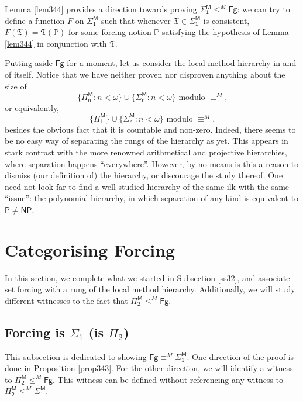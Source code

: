 \documentclass[12pt, twoside]{memoir}
\numberwithin{equation}{section}
\theoremstyle{definition}
\theoremstyle{remark}
\theoremstyle{definition}
\theoremstyle{definition}
\theoremstyle{definition}
\theoremstyle{remark}
\begin{document}
Lemma \ref{lem344} provides a direction towards proving $\mathsf{\Sigma^M_1} \leq^M \mathsf{Fg}$: we can try to define a function $F$ on $\mathsf{\Sigma^M_1}$ such that whenever $\mathfrak{T} \in \mathsf{\Sigma^M_1}$ is consistent, $F(\mathfrak{T}) = \mathfrak{T}(\mathbb{P})$ for some forcing notion $\mathbb{P}$ satisfying the hypothesis of Lemma \ref{lem344} in conjunction with $\mathfrak{T}$. 

Putting aside $\mathsf{Fg}$ for a moment, let us consider the local method hierarchy in and of itself. Notice that we have neither proven nor disproven anything about the size of
\begin{equation*}
    \{\mathsf{\Pi^M_n} : n < \omega\} \cup \{\mathsf{\Sigma^M_n} : n < \omega\} \text{ modulo } \equiv^M \text{,}
\end{equation*}
or equivalently, 
\begin{equation*}
    \{\mathsf{\Pi^M_1}\} \cup \{\mathsf{\Sigma^M_n} : n < \omega\} \text{ modulo } \equiv^M \text{,}
\end{equation*}
besides the obvious fact that it is countable and non-zero. Indeed, there seems to be no easy way of separating the rungs of the hierarchy as yet. This appears in stark contrast with the more renowned arithmetical and projective hierarchies, where separation happens ``everywhere''. However, by no means is this a reason to dismiss (our definition of) the hierarchy, or discourage the study thereof. One need not look far to find a well-studied hierarchy of the same ilk with the same ``issue'': the polynomial hierarchy, in which separation of any kind is equivalent to $\mathsf{P} \neq \mathsf{NP}$. 

\section{Categorising Forcing}

In this section, we complete what we started in Subsection \ref{ss32}, and associate set forcing with a rung of the local method hierarchy. Additionally, we will study different witnesses to the fact that $\mathsf{\Pi^M_2} \leq^M \mathsf{Fg}$.

\subsection{Forcing is \texorpdfstring{$\Sigma_1$}{Σ-1} (is \texorpdfstring{$\Pi_2$}{Π-2})}

This subsection is dedicated to showing $\mathsf{Fg} \equiv^M \mathsf{\Sigma^M_1}$. One direction of the proof is done in Proposition \ref{prop343}. For the other direction, we will identify a witness to $\mathsf{\Pi^M_2} \leq^M \mathsf{Fg}$. This witness can be defined without referencing any witness to $\mathsf{\Pi^M_2} \leq^M \mathsf{\Sigma^M_1}$.
\end{document}
